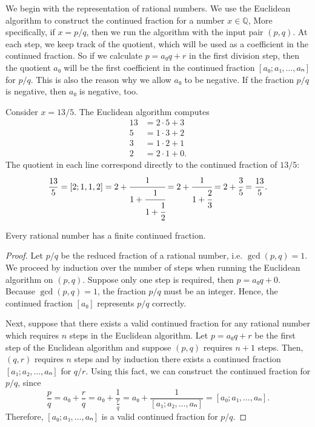 We begin with the representation of rational numbers.
We use the Euclidean algorithm to construct the continued fraction for a number $x ∈ ℚ$,
More specifically, if $x = p/q$, then we run the algorithm with the input pair $(p, q)$.
At each step, we keep track of the quotient,
which will be used as a coefficient in the continued fraction.
So if we calculate $p = a₀q + r$ in the first division step, then the quotient $a₀$ will be
the first coefficient in the continued fraction $[a₀; a₁, …, aₙ]$ for $p/q$.
This is also the reason why we allow $a₀$ to be negative.
If the fraction $p/q$ is negative, then $a₀$ is negative, too.

\begin{example}
  Consider $x = 13/5$.
  The Euclidean algorithm computes
  \begin{align*}
    13 & = 2 · 5 + 3 \\
     5 & = 1 · 3 + 2 \\
     3 & = 1 · 2 + 1 \\
     2 & = 2 · 1 + 0.
  \end{align*}
  The quotient in each line correspond directly to the continued fraction of $13/5$:
  \[
    \frac{13}{5}
    = [2; 1, 1, 2]
    = 2 + \cfrac{1}{1 + \cfrac{1}{1 + \cfrac{1}{2}}}
    = 2 + \cfrac{1}{1 + \cfrac{2}{3}}
    = 2 + \cfrac{3}{5}
    = \frac{13}{5}.
  \]
\end{example}

\begin{lemma}
  \label{lem:cf-rat}
  Every rational number has a finite continued fraction.
\end{lemma}

\begin{proof}
  Let $p/q$ be the reduced fraction of a rational number, i.e. $\gcd(p, q) = 1$.
  We proceed by induction over the number of steps when running the
  Euclidean algorithm on $(p, q)$.
  Suppose only one step is required, then $p = a₀ q + 0$.
  Because $\gcd(p, q) = 1$, the fraction $p/q$ must be an integer.
  Hence, the continued fraction $[a₀]$ represents $p/q$ correctly.

  Next, suppose that there exists a valid continued fraction for any rational
  number which requires $n$ steps in the Euclidean algorithm.
  Let $p = a₀ q + r$ be the first step of the Euclidean algorithm
  and suppose $(p, q)$ requires $n+1$ steps.
  Then, $(q, r)$ requires $n$ steps and by induction there exists a continued
  fraction $[a₁; a₂, …, aₙ]$ for $q/r$.
  Using this fact, we can construct the continued fraction for $p/q$, since
  \[
    \frac{p}{q}
    = a₀ + \frac{r}{q}
    = a₀ + \frac{1}{\frac{r}{q}}
    = a₀ + \frac{1}{[a₁; a₂, …, aₙ]}
    = [a₀; a₁, …, aₙ].
  \]
  Therefore, $[a₀; a₁, …, aₙ]$ is a valid continued fraction for $p/q$.
\end{proof}

